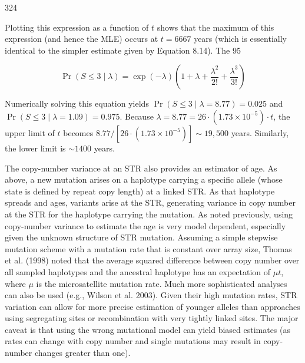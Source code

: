 \documentclass{article}
\begin{document}
324

Plotting this expression as a function of $t$ shows that the maximum of this expression (and hence the MLE) occurs at $t = 6667$ years (which is essentially identical to the simpler estimate given by Equation 8.14). The 95%

\begin{equation}
\Pr(S\leq3\mid\lambda)=\exp(-\lambda)\left(1+\lambda+\frac{\lambda^{2}}{2!}+\frac{\lambda^{3}}{3!}\right)
\end{equation}

Numerically solving this equation yields  $ \Pr(S \leq 3 \mid \lambda = 8.77) = 0.025 $ and  $ \Pr(S \leq 3 \mid \lambda = 1.09) = 0.975 $. Because  $ \lambda = 8.77 = 26 \cdot (1.73 \times 10^{-5}) \cdot t $, the upper limit of  $ t $ becomes  $ 8.77 / [26 \cdot (1.73 \times 10^{-5})] \sim 19,500 $ years. Similarly, the lower limit is  $ \sim 1400 $ years.

The copy-number variance at an STR also provides an estimator of age. As above, a new mutation arises on a haplotype carrying a specific allele (whose state is defined by repeat copy length) at a linked STR. As that haplotype spreads and ages, variants arise at the STR, generating variance in copy number at the STR for the haplotype carrying the mutation. As noted previously, using copy-number variance to estimate the age is very model dependent, especially given the unknown structure of STR mutation. Assuming a simple stepwise mutation scheme with a mutation rate that is constant over array size, Thomas et al. (1998) noted that the average squared difference between copy number over all sampled haplotypes and the ancestral haplotype has an expectation of  $ \mu t $, where  $ \mu $ is the microsatellite mutation rate. Much more sophisticated analyses can also be used (e.g., Wilson et al. 2003). Given their high mutation rates, STR variation can allow for more precise estimation of younger alleles than approaches using segregating sites or recombination with very tightly linked sites. The major caveat is that using the wrong mutational model can yield biased estimates (as rates can change with copy number and single mutations may result in copy-number changes greater than one).
\end{document}
